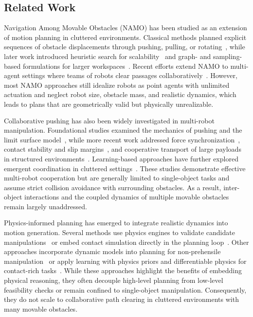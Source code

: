 \subsection{Related Work}\label{subsec:intro-related}

Navigation Among Movable Obstacles (NAMO) has been studied as an extension of
motion planning in cluttered environments. Classical methods planned explicit
sequences of obstacle displacements through pushing, pulling, or
rotating~\cite{stilman2005navigation,stilman2007manipulation}, while later work
introduced heuristic search for scalability~\cite{stilman2007manipulation} and
graph- and sampling-based formulations for larger workspaces~\cite{yao2024local}.
Recent efforts extend NAMO to multi-agent settings where teams of robots clear
passages collaboratively~\cite{tang2024collaborative,ren2025search}. However,
most NAMO approaches still idealize robots as point agents with unlimited
actuation and neglect robot size, obstacle mass, and realistic dynamics, which
leads to plans that are geometrically valid but physically unrealizable.

Collaborative pushing has also been widely investigated in multi-robot
manipulation. Foundational studies examined the mechanics of pushing and the
limit surface model~\cite{goyal1989limit,lynch1992manipulation}, while more
recent work addressed force synchronization~\cite{ni2023progressive}, contact
stability and slip margins~\cite{liu2025physics,chen2015occlusion}, and
cooperative transport of large payloads in structured
environments~\cite{ni2024physics,wang2006multi}. Learning-based approaches have
further explored emergent coordination in cluttered
settings~\cite{feng2025learning}. These studies demonstrate effective
multi-robot cooperation but are generally limited to single-object tasks and
assume strict collision avoidance with surrounding obstacles. As a result,
inter-object interactions and the coupled dynamics of multiple movable
obstacles remain largely unaddressed.

Physics-informed planning has emerged to integrate realistic dynamics into
motion generation. Several methods use physics engines to validate candidate
manipulations~\cite{lin2019efficient} or embed contact simulation directly in
the planning loop~\cite{rouxel2024multi}. Other approaches incorporate dynamic
models into planning for non-prehensile manipulation~\cite{zhou2017pushing,hou2020physics}
or apply learning with physics priors and differentiable physics for
contact-rich tasks~\cite{agrawal2016learning,ha2018reinforcement,ni2023progressive,liu2025physics}.
While these approaches highlight the benefits of embedding physical reasoning,
they often decouple high-level planning from low-level feasibility checks or
remain confined to single-object manipulation. Consequently, they do not scale
to collaborative path clearing in cluttered environments with many movable
obstacles.


